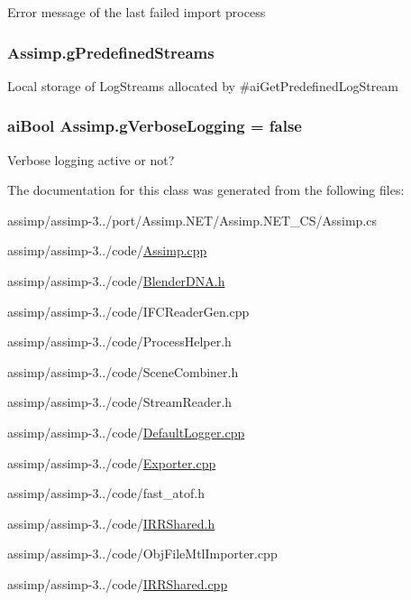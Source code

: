Error message of the last failed import process \hypertarget{class_assimp_a6ffd4b6612c75ee688b5f419f2701a08}{
\subsubsection[{g\+Predefined\+Streams}]{ Assimp.\+g\+Predefined\+Streams\hspace{0.3cm}{\ttfamily [static]}}}\label{class_assimp_a6ffd4b6612c75ee688b5f419f2701a08}
Local storage of Log\+Streams allocated by \#ai\+Get\+Predefined\+Log\+Stream \hypertarget{class_assimp_ad3e8dfd6154bf682588538967de0db4a}{
\subsubsection[{g\+Verbose\+Logging}]{\setlength{\rightskip}{0pt plus 5cm}ai\+Bool Assimp.\+g\+Verbose\+Logging = false\hspace{0.3cm}{\ttfamily [static]}}}\label{class_assimp_ad3e8dfd6154bf682588538967de0db4a}
Verbose logging active or not? 

The documentation for this class was generated from the following files\+:\begin{DoxyCompactItemize}
\item 
assimp/assimp-\/3../port/\+Assimp.\+N\+E\+T/\+Assimp.\+N\+E\+T\+\_\+\+C\+S/Assimp.\+cs\item 
assimp/assimp-\/3../code/\hyperlink{_assimp_8cpp}{Assimp.\+cpp}\item 
assimp/assimp-\/3../code/\hyperlink{_blender_d_n_a_8h}{Blender\+D\+N\+A.\+h}\item 
assimp/assimp-\/3../code/I\+F\+C\+Reader\+Gen.\+cpp\item 
assimp/assimp-\/3../code/Process\+Helper.\+h\item 
assimp/assimp-\/3../code/Scene\+Combiner.\+h\item 
assimp/assimp-\/3../code/Stream\+Reader.\+h\item 
assimp/assimp-\/3../code/\hyperlink{_default_logger_8cpp}{Default\+Logger.\+cpp}\item 
assimp/assimp-\/3../code/\hyperlink{_exporter_8cpp}{Exporter.\+cpp}\item 
assimp/assimp-\/3../code/fast\+\_\+atof.\+h\item 
assimp/assimp-\/3../code/\hyperlink{_i_r_r_shared_8h}{I\+R\+R\+Shared.\+h}\item 
assimp/assimp-\/3../code/Obj\+File\+Mtl\+Importer.\+cpp\item 
assimp/assimp-\/3../code/\hyperlink{_i_r_r_shared_8cpp}{I\+R\+R\+Shared.\+cpp}\end{DoxyCompactItemize}
